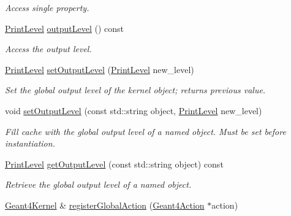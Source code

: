\begin{DoxyCompactItemize}
\begin{DoxyCompactList}\small\item\em Access single property. \item\end{DoxyCompactList}\item 
\hyperlink{namespace_d_d4hep_a5b5a64d56252469451f2020a27d57d42}{PrintLevel} \hyperlink{class_d_d4hep_1_1_simulation_1_1_geant4_kernel_a36af85f213b7ded85d93621bdeacf09c}{outputLevel} () const 
\begin{DoxyCompactList}\small\item\em Access the output level. \item\end{DoxyCompactList}\item 
\hyperlink{namespace_d_d4hep_a5b5a64d56252469451f2020a27d57d42}{PrintLevel} \hyperlink{class_d_d4hep_1_1_simulation_1_1_geant4_kernel_abf3fb3881f4e504ab8c4b14aa17ac7c8}{setOutputLevel} (\hyperlink{namespace_d_d4hep_a5b5a64d56252469451f2020a27d57d42}{PrintLevel} new\_\-level)
\begin{DoxyCompactList}\small\item\em Set the global output level of the kernel object; returns previous value. \item\end{DoxyCompactList}\item 
void \hyperlink{class_d_d4hep_1_1_simulation_1_1_geant4_kernel_aa2a86e9223fa508132a57669fab477d5}{setOutputLevel} (const std::string object, \hyperlink{namespace_d_d4hep_a5b5a64d56252469451f2020a27d57d42}{PrintLevel} new\_\-level)
\begin{DoxyCompactList}\small\item\em Fill cache with the global output level of a named object. Must be set before instantiation. \item\end{DoxyCompactList}\item 
\hyperlink{namespace_d_d4hep_a5b5a64d56252469451f2020a27d57d42}{PrintLevel} \hyperlink{class_d_d4hep_1_1_simulation_1_1_geant4_kernel_a0b9efcb33597d3a7191f3067c2691473}{getOutputLevel} (const std::string object) const 
\begin{DoxyCompactList}\small\item\em Retrieve the global output level of a named object. \item\end{DoxyCompactList}\item 
\hyperlink{class_d_d4hep_1_1_simulation_1_1_geant4_kernel}{Geant4Kernel} \& \hyperlink{class_d_d4hep_1_1_simulation_1_1_geant4_kernel_a8792d3d0db403a52fe6495456b45c97a}{registerGlobalAction} (\hyperlink{class_d_d4hep_1_1_simulation_1_1_geant4_action}{Geant4Action} $\ast$action)

\end{DoxyCompactItemize}
